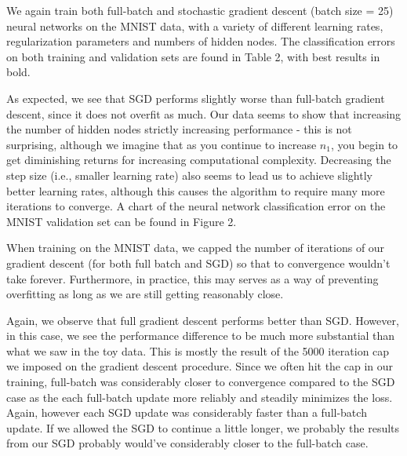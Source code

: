 \documentclass[10pt]{article}
\begin{document}
We again train both full-batch and stochastic gradient descent (batch size = 25) neural networks on the MNIST data, with a variety of different learning rates, regularization parameters and numbers of hidden nodes. The classification errors on both training and validation sets are found in Table 2, with best results in bold. 

As expected, we see that SGD performs slightly worse than full-batch gradient descent, since it does not overfit as much. Our data seems to show that increasing the number of hidden nodes strictly increasing performance - this is not surprising, although we imagine that as you continue to increase $n_1$, you begin to get diminishing returns for increasing computational complexity. Decreasing the step size (i.e., smaller learning rate) also seems to lead us to achieve slightly better learning rates, although this causes the algorithm to require many more iterations to converge. A chart of the neural network classification error on the MNIST validation set can be found in Figure 2.

When training on the MNIST data, we capped the number of iterations of our gradient descent (for both full batch and SGD) so that to convergence wouldn't take forever. Furthermore, in practice, this may serves as a way of preventing overfitting as long as we are still getting reasonably close. 

Again, we observe that full gradient descent performs better than SGD. However, in this case, we see the performance difference to be much more substantial than what we saw in the toy data. This is mostly the result of the 5000 iteration cap we imposed on the gradient descent procedure. Since we often hit the cap in our training, full-batch was considerably closer to convergence compared to the SGD case as the each full-batch update more reliably and steadily minimizes the loss. Again, however each SGD update was considerably faster than a full-batch update. If we allowed the SGD to continue a little longer, we probably the results from our SGD probably would've considerably closer to the full-batch case. 
\end{document}
